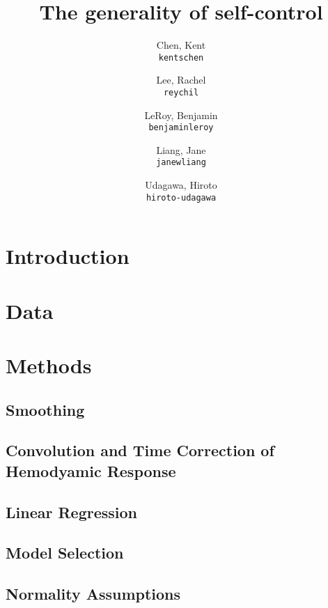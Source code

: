 \documentclass[11pt]{article}
\title{The generality of self-control}
\author{
  Chen, Kent\\
  \texttt{kentschen}
  \and
  Lee, Rachel\\
  \texttt{reychil}
  \and
  LeRoy, Benjamin\\
  \texttt{benjaminleroy}
  \and
  Liang, Jane\\
  \texttt{janewliang}
  \and
  Udagawa, Hiroto\\
  \texttt{hiroto-udagawa}
}
\begin{document}
\maketitle

\abstract{}

\section{Introduction} \label{introduction}
	

\section{Data} \label{data}

	
	
\section{Methods} \label{methods}
	\subsection{Smoothing}
	
		

	\subsection{Convolution and Time Correction of Hemodyamic Response}

		
		
	\subsection{Linear Regression}
	
		
		
	\subsection{Model Selection}
		
		

	\subsection{Normality Assumptions}
	
		
		
\end{document}
